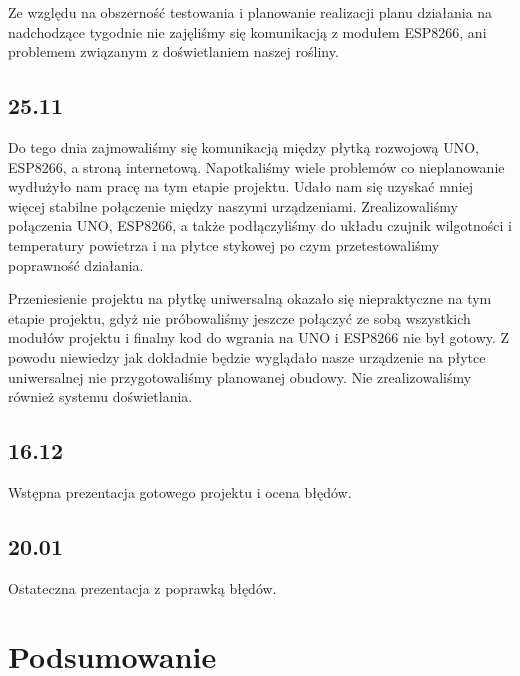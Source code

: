 \documentclass[12pt]{article}
\begin{document}
Ze względu na obszerność testowania i planowanie realizacji planu działania na nadchodzące tygodnie nie zajęliśmy się komunikacją z modułem ESP8266, ani problemem związanym z doświetlaniem naszej rośliny.


\subsection{25.11}
Do tego dnia zajmowaliśmy się komunikacją między płytką rozwojową UNO, ESP8266, a stroną internetową. Napotkaliśmy wiele problemów co nieplanowanie wydłużyło nam pracę na tym etapie projektu. Udało nam się uzyskać mniej więcej stabilne połączenie między naszymi urządzeniami. Zrealizowaliśmy połączenia UNO, ESP8266, a także podłączyliśmy do układu czujnik wilgotności i temperatury powietrza i na płytce stykowej po czym przetestowaliśmy poprawność działania. 

Przeniesienie projektu na płytkę uniwersalną okazało się niepraktyczne na tym etapie projektu, gdyż nie próbowaliśmy jeszcze połączyć ze sobą wszystkich modułów projektu i finalny kod do wgrania na UNO i ESP8266 nie był gotowy. Z powodu niewiedzy jak dokładnie będzie wyglądało nasze urządzenie na płytce uniwersalnej nie przygotowaliśmy planowanej obudowy. Nie zrealizowaliśmy również systemu doświetlania.

\subsection{16.12}
Wstępna prezentacja gotowego projektu i ocena błędów.

\subsection{20.01}
Ostateczna prezentacja z poprawką błędów.



\section{Podsumowanie }
\end{document}
